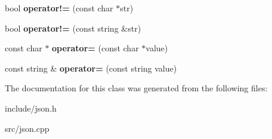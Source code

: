 \begin{DoxyCompactItemize}
\item 
\hypertarget{classjsonStr__t_a1e07f17e5232eee2db11e464ae34f5ea}{bool {\bfseries operator!=} (const char $\ast$str)}\label{classjsonStr__t_a1e07f17e5232eee2db11e464ae34f5ea}

\item 
\hypertarget{classjsonStr__t_a9eaf236e828366f333587fcbfc1ea9ca}{bool {\bfseries operator!=} (const string \&str)}\label{classjsonStr__t_a9eaf236e828366f333587fcbfc1ea9ca}

\item 
\hypertarget{classjsonStr__t_a42b63e43f8b9dc7e47d6e4cbefaf8b15}{const char $\ast$ {\bfseries operator=} (const char $\ast$value)}\label{classjsonStr__t_a42b63e43f8b9dc7e47d6e4cbefaf8b15}

\item 
\hypertarget{classjsonStr__t_aa73d59ec1d25dd90fe24ea7082d2cd87}{const string \& {\bfseries operator=} (const string value)}\label{classjsonStr__t_aa73d59ec1d25dd90fe24ea7082d2cd87}

\end{DoxyCompactItemize}


\-The documentation for this class was generated from the following files\-:\begin{DoxyCompactItemize}
\item 
include/json.\-h\item 
src/json.\-cpp\end{DoxyCompactItemize}

